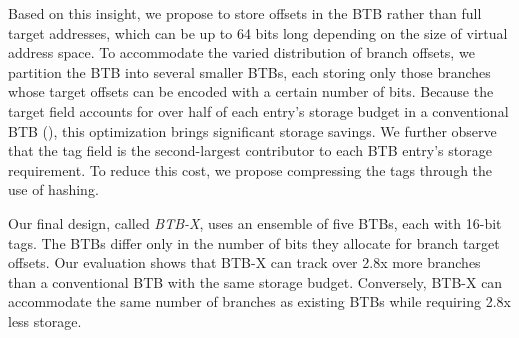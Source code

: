 Based on this insight, we propose to store offsets in the BTB rather than full target addresses, which can be up to 64 bits long depending on the size of virtual address space. To accommodate the varied distribution of branch offsets, we partition the BTB into several smaller BTBs, each storing only those branches whose target offsets can be encoded with a certain number of bits. Because the target field accounts for over half of each entry's storage budget in a conventional BTB (), this optimization brings significant storage savings.
We further observe that the tag field is the second-largest contributor to each BTB entry's storage requirement. To reduce this cost, we propose compressing the tags through the use of hashing.

Our final design, called {\em BTB-X}, uses an ensemble of five BTBs, each with 16-bit tags. The BTBs differ only in the number of bits they allocate for branch target offsets. Our evaluation shows that BTB-X can track over 2.8x more branches than a conventional BTB with the same storage budget. Conversely, BTB-X can accommodate the same number of branches as existing BTBs while requiring 2.8x less storage.